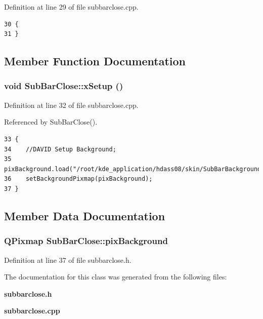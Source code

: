 Definition at line 29 of file subbarclose.cpp.



\footnotesize\begin{verbatim}30 {
31 }
\end{verbatim}\normalsize 


\subsection{Member Function Documentation}
\subsubsection{\setlength{\rightskip}{0pt plus 5cm}void Sub\-Bar\-Close::x\-Setup ()}\label{classSubBarClose_SubBarClosea2}




Definition at line 32 of file subbarclose.cpp.

Referenced by Sub\-Bar\-Close().



\footnotesize\begin{verbatim}33 {
34    //DAVID Setup Background;
35    pixBackground.load("/root/kde_application/hdass08/skin/SubBarBackground.png");
36    setBackgroundPixmap(pixBackground);
37 }
\end{verbatim}\normalsize 


\subsection{Member Data Documentation}
\subsubsection{\setlength{\rightskip}{0pt plus 5cm}QPixmap {\bf Sub\-Bar\-Close::pix\-Background}\hspace{0.3cm}{\tt  [private]}}\label{classSubBarClose_SubBarCloser0}




Definition at line 37 of file subbarclose.h.

The documentation for this class was generated from the following files:\begin{CompactItemize}
\item 
{\bf subbarclose.h}\item 
{\bf subbarclose.cpp}\end{CompactItemize}
